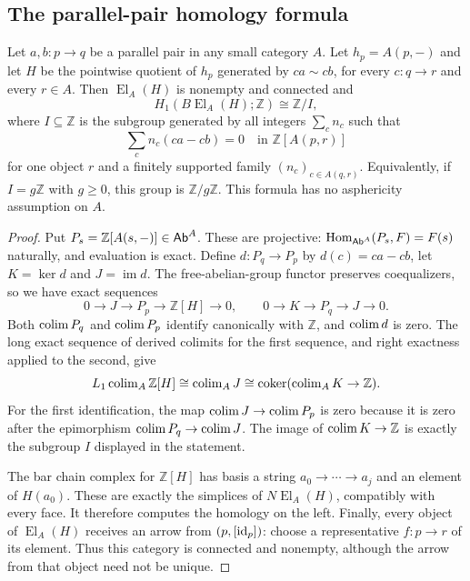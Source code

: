 \subsection{The parallel-pair homology formula}

\begin{proposition}\label{B:lead2}
Let $a,b:p\to q$ be a parallel pair in any small category $A$. Let $h_p=A(p,-)$ and let $H$ be the pointwise quotient of $h_p$ generated by $ca\sim cb$, for every $c:q\to r$ and every $r\in A$. Then $\operatorname{El}_A(H)$ is nonempty and connected and
\[
 H_1(B\operatorname{El}_A(H);\mathbb Z)\cong\mathbb Z/I,
\]
where $I\subseteq\mathbb Z$ is the subgroup generated by all integers $\sum_cn_c$ such that
\[
 \sum_cn_c(ca-cb)=0\quad\text{in }\mathbb Z[A(p,r)]
\]
for one object $r$ and a finitely supported family $(n_c)_{c\in A(q,r)}$. Equivalently, if $I=g\mathbb Z$ with $g\geq0$, this group is $\mathbb Z/g\mathbb Z$. This formula has no asphericity assumption on $A$.
\end{proposition}
\begin{proof}
Put $P_s=\mathbb Z[A(s,-)]\in\mathsf{Ab}^A$. These are projective: $\operatorname{Hom}_{\mathsf{Ab}^A}(P_s,F)=F(s)$ naturally, and evaluation is exact. Define $d:P_q\to P_p$ by $d(c)=ca-cb$, let $K=\ker d$ and $J=\operatorname{im}d$. The free-abelian-group functor preserves coequalizers, so we have exact sequences
\[
 0\to J\to P_p\to\mathbb Z[H]\to0,
 \qquad 0\to K\to P_q\to J\to0.
\]
Both $\operatorname{colim} P_q$ and $\operatorname{colim} P_p$ identify canonically with $\mathbb Z$, and $\operatorname{colim} d$ is zero. The long exact sequence of derived colimits for the first sequence, and right exactness applied to the second, give
\[
 L_1\operatorname{colim}_A\mathbb Z[H]
 \cong\operatorname{colim}_A J
 \cong\operatorname{coker}(\operatorname{colim}_AK\to\mathbb Z).
\]
For the first identification, the map $\operatorname{colim} J\to\operatorname{colim} P_p$ is zero because it is zero after the epimorphism $\operatorname{colim} P_q\to\operatorname{colim} J$. The image of $\operatorname{colim} K\to\mathbb Z$ is exactly the subgroup $I$ displayed in the statement.

The bar chain complex for $\mathbb Z[H]$ has basis a string $a_0\to\cdots\to a_j$ and an element of $H(a_0)$. These are exactly the simplices of $N\operatorname{El}_A(H)$, compatibly with every face. It therefore computes the homology on the left. Finally, every object of $\operatorname{El}_A(H)$ receives an arrow from $(p,[\mathrm{id}_p])$: choose a representative $f:p\to r$ of its element. Thus this category is connected and nonempty, although the arrow from that object need not be unique.
\end{proof}

